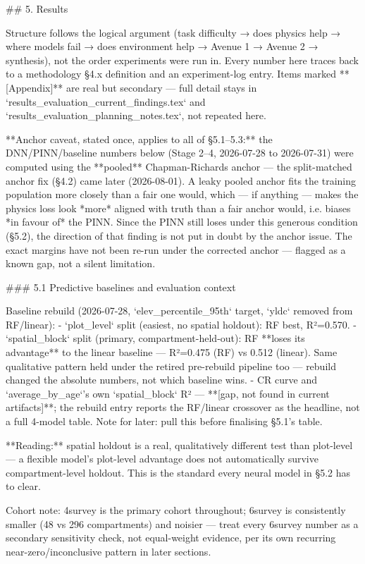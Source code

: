 ## 5. Results

Structure follows the logical argument (task difficulty → does physics help → where models fail →
does environment help → Avenue 1 → Avenue 2 → synthesis), not the order experiments were run in.
Every number here traces back to a methodology §4.x definition and an experiment-log entry.
Items marked **[Appendix]** are real but secondary — full detail stays in
`results_evaluation_current_findings.tex` and `results_evaluation_planning_notes.tex`, not repeated here.

**Anchor caveat, stated once, applies to all of §5.1–5.3:** the DNN/PINN/baseline numbers below
(Stage 2–4, 2026-07-28 to 2026-07-31) were computed using the **pooled** Chapman-Richards anchor —
the split-matched anchor fix (§4.2) came later (2026-08-01). A leaky pooled anchor fits the training
population more closely than a fair one would, which — if anything — makes the physics loss look
*more* aligned with truth than a fair anchor would, i.e. biases *in favour of* the PINN. Since the
PINN still loses under this generous condition (§5.2), the direction of that finding is not put in
doubt by the anchor issue. The exact margins have not been re-run under the corrected anchor —
flagged as a known gap, not a silent limitation.

### 5.1 Predictive baselines and evaluation context

Baseline rebuild (2026-07-28, `elev_percentile_95th` target, `yldc` removed from RF/linear):
- `plot_level` split (easiest, no spatial holdout): RF best, R²=0.570.
- `spatial_block` split (primary, compartment-held-out): RF **loses its advantage** to the linear baseline — R²=0.475 (RF) vs 0.512 (linear). Same qualitative pattern held under the retired pre-rebuild pipeline too — rebuild changed the absolute numbers, not which baseline wins.
- CR curve and `average_by_age`'s own `spatial_block` R² — **[gap, not found in current artifacts]**; the rebuild entry reports the RF/linear crossover as the headline, not a full 4-model table. Note for later: pull this before finalising §5.1's table.

**Reading:** spatial holdout is a real, qualitatively different test than plot-level — a flexible model's plot-level advantage does not automatically survive compartment-level holdout. This is the standard every neural model in §5.2 has to clear.

Cohort note: 4survey is the primary cohort throughout; 6survey is consistently smaller (48 vs 296 compartments) and noisier — treat every 6survey number as a secondary sensitivity check, not equal-weight evidence, per its own recurring near-zero/inconclusive pattern in later sections.

